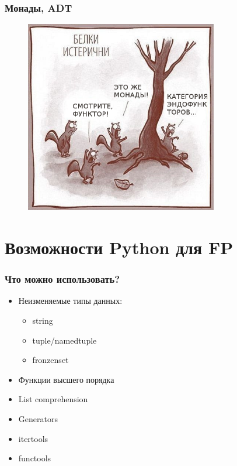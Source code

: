 \documentclass[18pt, compress, aspectratio=169]{beamer}
\begin{document}
\begin{frame}
    \frametitle{Монады, ADT}
    \vspace{-25pt}
    \begin{figure}
        \includegraphics[width=0.75\textwidth,center]{squirells.png}
    \end{figure}
\end{frame}

\fontsize{13pt}{14}\selectfont
\section{Возможности Python для FP}
\fontsize{17pt}{18}\selectfont

\begin{frame}
    \frametitle{Что можно использовать?}
    \vspace{-25pt}
    \begin{itemize}[label={\MVRightarrow}]
        \item <+->Неизменяемые типы данных:
            \begin{itemize}
                \item string
                \item tuple/namedtuple
                \item fronzenset
            \end{itemize}
        \item <+->Функции высшего порядка
        \item <+->List comprehension
        \item <+->Generators
        \item <+->itertools
        \item <+->functools
    \end{itemize}
\end{frame}
\end{document}

